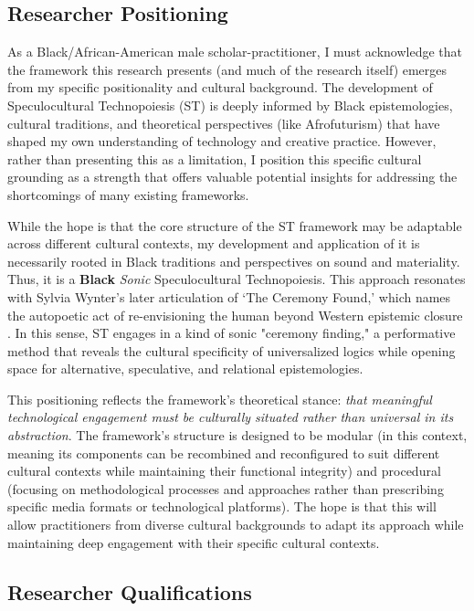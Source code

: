 \subsection{Researcher Positioning}

As a Black/African-American male scholar-practitioner, I must acknowledge that the framework this research presents (and much of the research itself) emerges from my specific positionality and cultural background. The development of Speculocultural Technopoiesis (ST) is deeply informed by Black epistemologies, cultural traditions, and theoretical perspectives (like Afrofuturism) that have shaped my own understanding of technology and creative practice. However, rather than presenting this as a limitation, I position this specific cultural grounding as a strength that offers valuable potential insights for addressing the shortcomings of many existing frameworks.

While the hope is that the core structure of the ST framework may be adaptable across different cultural contexts, my development and application of it is necessarily rooted in Black traditions and perspectives on sound and materiality. Thus, it is a \textbf{Black} \textit{Sonic} Speculocultural Technopoiesis. This approach resonates with Sylvia Wynter’s later articulation of ‘The Ceremony Found,’ which names the autopoetic act of re-envisioning the human beyond Western epistemic closure \parencite{Wynter_2015}. In this sense, ST engages in a kind of sonic "ceremony finding," a performative method that reveals the cultural specificity of universalized logics while opening space for alternative, speculative, and relational epistemologies.

This positioning reflects the framework's theoretical stance: \textit{that meaningful technological engagement must be culturally situated rather than universal in its abstraction}. The framework's structure is designed to be modular (in this context, meaning its components can be recombined and reconfigured to suit different cultural contexts while maintaining their functional integrity) and procedural (focusing on methodological processes and approaches rather than prescribing specific media formats or technological platforms). The hope is that this will allow practitioners from diverse cultural backgrounds to adapt its approach while maintaining deep engagement with their specific cultural contexts.

\subsection{Researcher Qualifications}

